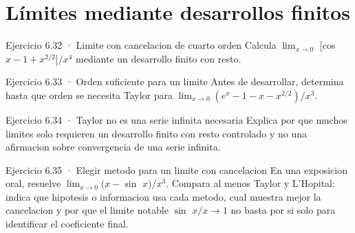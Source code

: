 \documentclass[10pt,a4paper,oneside,openany]{book}
\begin{document}
\section{Límites mediante desarrollos finitos}
\begin{PSevenExerciseFixed}{Ejercicio 6.32 · Limite con cancelacion de cuarto orden}
Calcula \(\lim_{x\to 0}\) [cos \(x-1+x^{2/2}]/x^{4}\) mediante un desarrollo finito con resto.
\end{PSevenExerciseFixed}
\begin{PSevenExerciseFixed}{Ejercicio 6.33 · Orden suficiente para un limite}
Antes de desarrollar, determina hasta que orden se necesita Taylor para \(\lim_{x\to 0}(e^x-1-x-x^{2/2})/x^{3}\).
\end{PSevenExerciseFixed}
\begin{PSevenExerciseFixed}{Ejercicio 6.34 · Taylor no es una serie infinita necesaria}
Explica por que muchos limites solo requieren un desarrollo finito con resto controlado y no una afirmacion sobre convergencia de una serie infinita.
\end{PSevenExerciseFixed}
\begin{PSevenExerciseFixed}{Ejercicio 6.35 · Elegir metodo para un limite con cancelacion}
En una exposicion oral, resuelve \(\lim_{x\to 0}(x-\sin\) \(x)/x^{3}\). Compara al menos Taylor y L'Hopital: indica que hipotesis o informacion usa cada metodo, cual muestra mejor la cancelacion y por que el limite notable \(\sin\) \(x/x\to 1\) no basta por si solo para identificar el coeficiente final.
\end{PSevenExerciseFixed}
\end{document}
